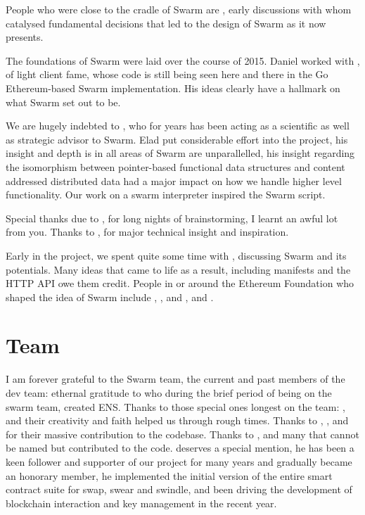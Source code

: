 People who were close to the cradle of Swarm are ,  early discussions with whom catalysed fundamental decisions that led to the design of Swarm as it now presents.

The foundations of Swarm were laid over the course of 2015.
Daniel worked with , of light client fame, whose code is still being seen here and there in the Go Ethereum-based Swarm implementation. His ideas clearly have a hallmark on what Swarm set out to be. 

We are hugely indebted to , who for years has been acting as a scientific as well as strategic advisor to Swarm. Elad put considerable effort into the project, his insight and depth is in all areas of Swarm are unparallelled, his insight regarding the isomorphism between pointer-based functional data structures and content addressed distributed data had a major impact on how we handle higher level functionality. Our work on a swarm interpreter inspired the Swarm script.

Special thanks due to ,  for long nights of brainstorming, I learnt an awful lot from you. Thanks to ,  for major technical insight and inspiration.

Early in the project, we spent quite some time with ,  discussing Swarm and its potentials. Many ideas that came to life as a result, including manifests and the HTTP API owe them credit. People in or around the Ethereum Foundation who shaped the idea of Swarm include , ,  and ,  and . 

\section*{Team}

I am forever grateful to the Swarm team, the current and past members of the dev team: ethernal gratitude to  who during the brief period of being on the swarm team, created ENS. Thanks to those special ones longest on the team: ,  and  their creativity and faith helped us through rough  times. Thanks to , ,  and  for their massive contribution to the codebase. Thanks to ,  and many that cannot be named but contributed to the code.
 deserves a special mention, he has been a keen follower and supporter of our project for many years and gradually became an honorary member, he implemented the initial version of the entire smart contract suite for swap, swear and swindle, and been driving the development of blockchain interaction and key management in the recent year.

